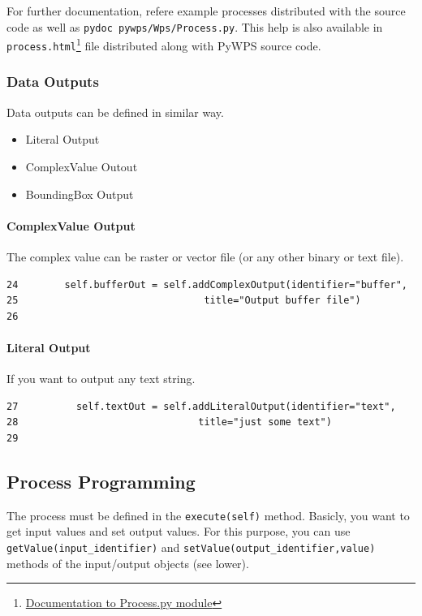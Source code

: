\documentclass[a4paper,11pt]{article}
\begin{document}
For further documentation, refere example processes distributed with the
source code as well as \texttt{pydoc~pywps/Wps/Process.py}. This help is
also available in
\texttt{process.html}\footnote{\href{http://wald.intevation.org/plugins/scmsvn/viewcvs.php/*checkout*/trunk/doc/process.html?rev=369&root=pywps}{Documentation
to Process.py module}} file distributed along with PyWPS
source code.

\subsubsection{Data Outputs}
Data outputs can be defined in similar way.
\begin{itemize}
    \item Literal Output
    \item ComplexValue Outout
    \item BoundingBox Output
\end{itemize}
    
\paragraph{ComplexValue Output}
The complex value can be raster or vector file (or any other binary or text
file).

\begin{verbatim}
24        self.bufferOut = self.addComplexOutput(identifier="buffer",
25                                title="Output buffer file")
26
\end{verbatim}

\paragraph{Literal Output}
If you want to output any text string.
\begin{verbatim}
27          self.textOut = self.addLiteralOutput(identifier="text",
28                               title="just some text")
29
\end{verbatim}

\subsection{Process Programming}
    
The process must be defined in the \texttt{execute(self)} method. 
Basicly, you want to get input values and set output values. For this
purpose, you can use \texttt{getValue(input\_identifier)} and
\texttt{setValue(output\_identifier,value)} methods of the input/output
objects (see lower).
\end{document}
